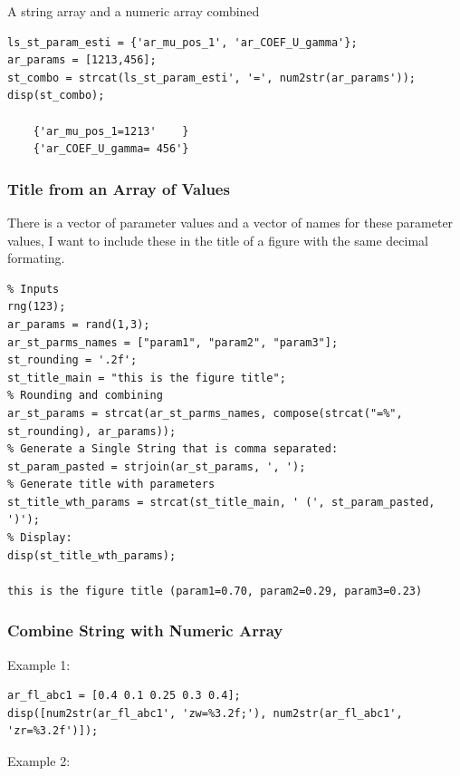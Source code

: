 \documentclass[
]{book}
\begin{document}
A string array and a numeric array combined

\begin{verbatim}
ls_st_param_esti = {'ar_mu_pos_1', 'ar_COEF_U_gamma'};
ar_params = [1213,456];
st_combo = strcat(ls_st_param_esti', '=', num2str(ar_params'));
disp(st_combo);

    {'ar_mu_pos_1=1213'    }
    {'ar_COEF_U_gamma= 456'}
\end{verbatim}

\hypertarget{title-from-an-array-of-values}{%
\subsubsection{Title from an Array of Values}\label{title-from-an-array-of-values}}

There is a vector of parameter values and a vector of names for these
parameter values, I want to include these in the title of a figure with
the same decimal formating.

\begin{verbatim}
% Inputs
rng(123);
ar_params = rand(1,3);
ar_st_parms_names = ["param1", "param2", "param3"];
st_rounding = '.2f';
st_title_main = "this is the figure title";
% Rounding and combining
ar_st_params = strcat(ar_st_parms_names, compose(strcat("=%", st_rounding), ar_params));
% Generate a Single String that is comma separated:
st_param_pasted = strjoin(ar_st_params, ', ');
% Generate title with parameters
st_title_wth_params = strcat(st_title_main, ' (', st_param_pasted, ')');
% Display:
disp(st_title_wth_params);

this is the figure title (param1=0.70, param2=0.29, param3=0.23)
\end{verbatim}

\hypertarget{combine-string-with-numeric-array}{%
\subsubsection{Combine String with Numeric Array}\label{combine-string-with-numeric-array}}

Example 1:

\begin{verbatim}
ar_fl_abc1 = [0.4 0.1 0.25 0.3 0.4];
disp([num2str(ar_fl_abc1', 'zw=%3.2f;'), num2str(ar_fl_abc1', 'zr=%3.2f')]);
\end{verbatim}

Example 2:
\end{document}
